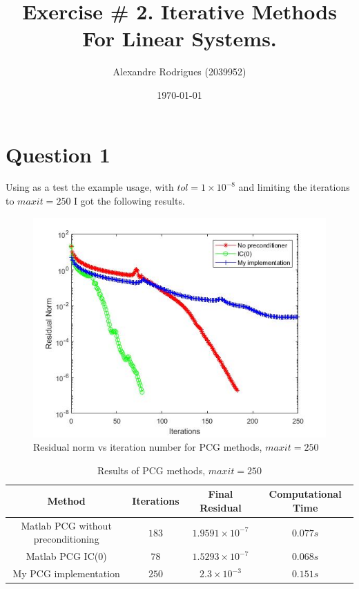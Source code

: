 \documentclass[a4paper, 11pt]{article}
\begin{document}
	
	\title{Exercise \# 2. Iterative Methods For Linear Systems. }
	\author{{\small Alexandre Rodrigues (2039952)}}
	\date{\today}
	
	\maketitle
		\section*{Question 1}
			Using as a test the example usage, with $tol = 1 \times 10^{-8}$ and limiting the iterations to $maxit=250$ I got the following results. 
		
			\begin{figure}[H]
				\centering
				\includegraphics[width=.6\linewidth]{ex1_it250.jpg}
				\caption{Residual norm vs iteration number for PCG methods, $maxit=250$}
				\label{fig:ex1_it250}
			\end{figure}
		
			\begin{table}[H]
				\centering
				\begin{tabular}{c|c|c|c}
					\textbf{Method} 					&  \textbf{Iterations} 	& \textbf{Final Residual} 		& \textbf{Computational Time} 	\\ \hline
					Matlab PCG without preconditioning	& 			$183$ 		& $ 1.9591 \times 10^{-7} $ 	& $ 0.077 s $					\\ \hline
					Matlab PCG IC(0)					& 			$78$ 		& $ 1.5293 \times 10^{-7} $ 	& $ 0.068 s $					\\ \hline	
					My PCG implementation				& 			$250$		& $ 2.3 \times 10^{-3} $		& $	0.151 s $					\\
				\end{tabular}
				\caption{Results of PCG methods, $maxit=250$}
				\label{table:ex1_it250}
			\end{table}
		
\end{document}
